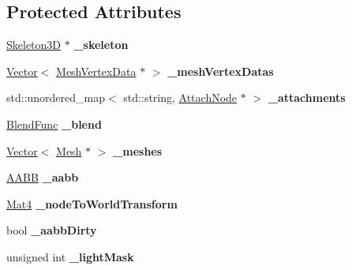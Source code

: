\subsection*{Protected Attributes}
\begin{DoxyCompactItemize}
\item 
\mbox{\label{classSprite3D_aa3b9f8f3ea19e01c66d3693aff1d92ff}} 
\hyperlink{classSkeleton3D}{Skeleton3D} $\ast$ {\bfseries \+\_\+skeleton}
\item 
\mbox{\label{classSprite3D_a34837786c7d746c0f2290058665a40b6}} 
\hyperlink{classVector}{Vector}$<$ \hyperlink{classMeshVertexData}{Mesh\+Vertex\+Data} $\ast$ $>$ {\bfseries \+\_\+mesh\+Vertex\+Datas}
\item 
\mbox{\label{classSprite3D_a3660ada72fb327edd661f1980f84687f}} 
std\+::unordered\+\_\+map$<$ std\+::string, \hyperlink{classAttachNode}{Attach\+Node} $\ast$ $>$ {\bfseries \+\_\+attachments}
\item 
\mbox{\label{classSprite3D_a07726f61c45478379027c44f0c91047e}} 
\hyperlink{structBlendFunc}{Blend\+Func} {\bfseries \+\_\+blend}
\item 
\mbox{\label{classSprite3D_a64b78069682d68a04aa3f21dc079a6d2}} 
\hyperlink{classVector}{Vector}$<$ \hyperlink{classMesh}{Mesh} $\ast$ $>$ {\bfseries \+\_\+meshes}
\item 
\mbox{\label{classSprite3D_a31ee3888f08af1ba6569dd24a2dc0401}} 
\hyperlink{classAABB}{A\+A\+BB} {\bfseries \+\_\+aabb}
\item 
\mbox{\label{classSprite3D_a1d4d8e2c9d384ae448e7ca4203e2a6d6}} 
\hyperlink{classMat4}{Mat4} {\bfseries \+\_\+node\+To\+World\+Transform}
\item 
\mbox{\label{classSprite3D_a9b46ec37e53a3b4442c229846ffd6026}} 
bool {\bfseries \+\_\+aabb\+Dirty}
\item 
\mbox{\label{classSprite3D_a758c16f42966ee30c72e9aa98d188c58}} 
unsigned int {\bfseries \+\_\+light\+Mask}
\item 
\mbox{\label{classSprite3D_a40b8a899b673623c1877749f47559cba}} 

\end{DoxyCompactItemize}
